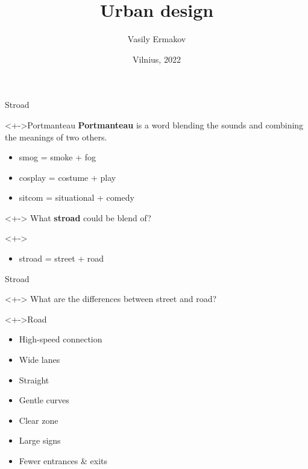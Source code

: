 \documentclass{beamer}
\begin{document}
    \title{Urban design}
    \author{Vasily Ermakov}
    \date{Vilnius, 2022}
    \frame{\titlepage}

    \begin{frame}{Stroad}
        \begin{block}
            <+->{Portmanteau}
            \textbf{Portmanteau} is a word blending the sounds and combining the meanings of two others.\\
            \begin{itemize}
                \item smog = smoke + fog
                \item cosplay = costume + play
                \item sitcom = situational + comedy
            \end{itemize}
        \end{block}
        \begin{block}
            <+->{}
            What \textbf{stroad} could be blend of?
        \end{block}
        \begin{block}
            <+->{}
            \begin{itemize}
                \item stroad = street + road
            \end{itemize}
        \end{block}
    \end{frame}

    \begin{frame}{Stroad}
        \begin{block}
            <+->{}
            What are the differences between street and road?
        \end{block}
        \begin{block}
            <+->{Road}
            \begin{itemize}
                \item High-speed connection
                \item Wide lanes
                \item Straight
                \item Gentle curves
                \item Clear zone
                \item Large signs
                \item Fewer entrances \& exits
            \end{itemize}
        \end{block}
    \end{frame}
\end{document}
